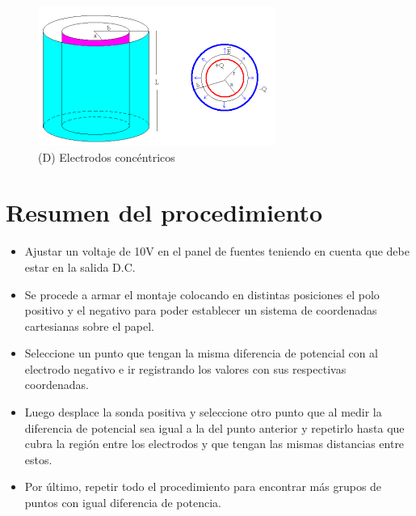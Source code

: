 \documentclass[letterpaper, 12pt]{report}
\begin{document}
\begin{figure}[H]
	\begin{center}
		\includegraphics[scale = 1.4]{./Images/D.png}
		\caption{(D) Electrodos concéntricos}
	\end{center}
\end{figure}

\section{Resumen del procedimiento}

\begin{itemize}
	\item Ajustar un voltaje de 10V en el panel de fuentes teniendo en cuenta
	      que debe estar en la salida D.C.
	\item Se procede a armar el montaje colocando en distintas posiciones el
	      polo positivo y el negativo para poder establecer un sistema de
	      coordenadas cartesianas sobre el papel.
	\item Seleccione un punto que tengan la misma diferencia de potencial con
	      al electrodo negativo e ir registrando los valores con sus respectivas
	      coordenadas.
	\item Luego desplace  la sonda positiva y seleccione otro punto que al
	      medir la diferencia de potencial sea igual a la del punto anterior y
	      repetirlo hasta que cubra la región entre los electrodos y que tengan las
	      mismas distancias entre estos.
	\item Por último, repetir todo el procedimiento para encontrar más grupos
	      de puntos con igual diferencia de potencia.
\end{itemize}


\newpage

\end{document}
